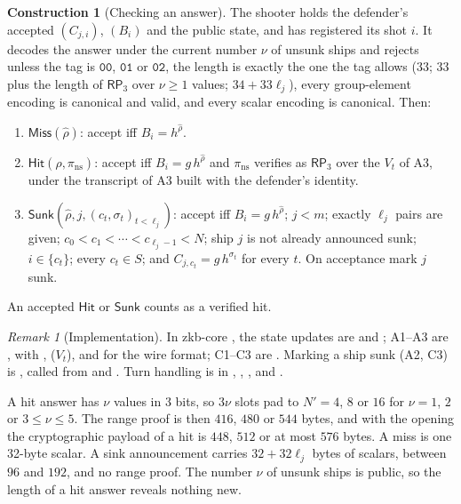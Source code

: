 \documentclass[11pt]{article}
\theoremstyle{definition}
\newtheorem{construction}[lemma]{Construction}
\theoremstyle{remark}
\newtheorem{remark}[lemma]{Remark}
\newcommand{\RP}{\mathsf{RP}}
\begin{document}
\begin{construction}[Checking an answer]\label{con:check}
The shooter holds the defender's accepted $(C_{j,i})$, $(B_i)$ and the public state, and has registered its shot $i$. It decodes the answer under the current number $\nu$ of unsunk ships and rejects unless the tag is $\mathtt{00}$, $\mathtt{01}$ or $\mathtt{02}$, the length is exactly the one the tag allows ($33$; $33$ plus the length of $\RP_3$ over $\nu\ge1$ values; $34+33\ell_j$), every group-element encoding is canonical and valid, and every scalar encoding is canonical. Then:
\begin{enumerate}[label=C\arabic*.]
  \item $\mathsf{Miss}(\hat\rho)$: accept iff $B_i=h^{\hat\rho}$.
  \item $\mathsf{Hit}(\hat\rho,\pi_{\mathrm{ns}})$: accept iff $B_i=g\,h^{\hat\rho}$ and $\pi_{\mathrm{ns}}$ verifies as $\RP_3$ over the $V_t$ of A3, under the transcript of A3 built with the defender's identity.
  \item $\mathsf{Sunk}(\hat\rho,j,(c_t,\sigma_t)_{t<\ell_j})$: accept iff $B_i=g\,h^{\hat\rho}$; $j<m$; exactly $\ell_j$ pairs are given; $c_0<c_1<\cdots<c_{\ell_j-1}<N$; ship $j$ is not already announced sunk; $i\in\{c_t\}$; every $c_t\in S$; and $C_{j,c_t}=g\,h^{\sigma_t}$ for every $t$. On acceptance mark $j$ sunk.
\end{enumerate}
An accepted $\mathsf{Hit}$ or $\mathsf{Sunk}$ counts as a verified hit.
\end{construction}

\begin{remark}[Implementation]\label{rem:impl-play}
In zkb-core , the state updates are  and ; A1--A3 are , with ,  ($V_t$),  and  for the wire format; C1--C3 are . Marking a ship sunk (A2, C3) is , called from  and . Turn handling is in , , ,  and .
\end{remark}

A hit answer has $\nu$ values in $3$ bits, so $3\nu$ slots pad to $N'=4$, $8$ or $16$ for $\nu=1$, $2$ or $3\le\nu\le5$. The range proof is then $416$, $480$ or $544$ bytes, and with the opening the cryptographic payload of a hit is $448$, $512$ or at most $576$ bytes. A miss is one 32-byte scalar. A sink announcement carries $32+32\ell_j$ bytes of scalars, between $96$ and $192$, and no range proof. The number $\nu$ of unsunk ships is public, so the length of a hit answer reveals nothing new.
\end{document}

